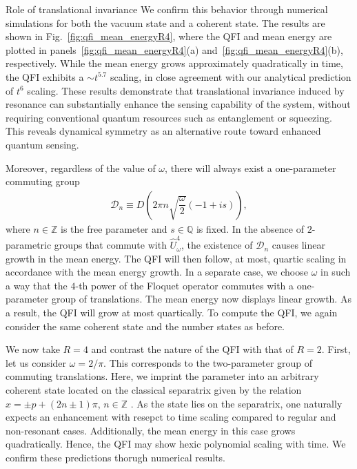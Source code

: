 \documentclass[amsmath,nobibnotes,aps,amssymb,pra, prl,aps,showpacs,superscriptaddress,twocolumn, longbibliography, reprint]{revtex4-2}
\begin{document}
\begin{section}{Role of translational invariance}
We confirm this behavior through numerical simulations for both the vacuum state and a coherent state. The results are shown in Fig.~\ref{fig:qfi_mean_energyR4}, where the QFI and mean energy are plotted in panels~\ref{fig:qfi_mean_energyR4}(a) and~\ref{fig:qfi_mean_energyR4}(b), respectively. While the mean energy grows approximately quadratically in time, the QFI exhibits a $\sim t^{5.7}$ scaling, in close agreement with our analytical prediction of $t^6$ scaling. These results demonstrate that translational invariance induced by resonance can substantially enhance the sensing capability of the system, without requiring conventional quantum resources such as entanglement or squeezing. This reveals dynamical symmetry as an alternative route toward enhanced quantum sensing.
  
 
\iffalse
Moreover, regardless of the value of $\omega$, there will always exist a one-parameter commuting group
\begin{eqnarray}
\mathcal{D}_n\equiv D\left(2\pi n\sqrt{\dfrac{\omega}{2}}\left(-1+is\right)\right),
\end{eqnarray}
where $n\in\mathbb{Z}$ is the free parameter and $s\in\mathbb{Q}$ is fixed. In the absence of $2$-parametric groups that commute with $\hat{U}^{4}_{\omega}$, the existence of $\mathcal{D}_n$ causes linear growth in the mean energy. The QFI will then follow, at most, quartic scaling in accordance with the mean energy growth. In a separate case, we choose $\omega$ in such a way that the $4$-th power of the Floquet operator commutes with a one-parameter group of translations. The mean energy now displays linear growth. As a result, the QFI will grow at most quartically. To compute the QFI, we again consider the same coherent state and the number states as before.  


We now take $R=4$ and contrast the nature of the QFI with that of $R=2$. First, let us consider $\omega=2/\pi$. This corresponds to the two-parameter group of commuting translations. Here, we imprint the parameter into an arbitrary coherent state located on the classical separatrix given by the relation $x=\pm p+(2n\pm 1)\pi$, $n\in\mathbb{Z}$ \cite{afanasiev1990width}. As the state lies on the separatrix, one naturally expects an enhancement with resepct to time scaling compared to regular and non-resonant cases. Additionally, the mean energy in this case grows quadratically. Hence, the QFI may show hexic polynomial scaling with time. We confirm these predictions thorugh numerical results. 


\end{section}
\end{document}
